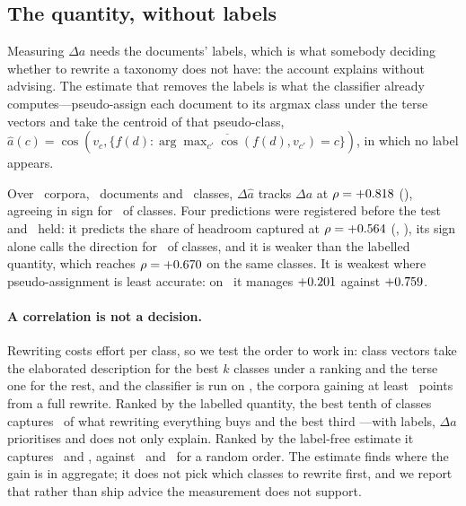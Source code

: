 \documentclass[11pt]{article}
\begin{document}
\subsection{The quantity, without labels}
\label{sec:estimate}

Measuring $\Delta a$ needs the documents' labels, which is what somebody
deciding whether to rewrite a taxonomy does not have: the account explains
without advising. The estimate that removes the labels is what the classifier
already computes---pseudo-assign each document to its argmax class under the
terse vectors and take the centroid of that pseudo-class,
$\hat{a}(c) = \cos(v_c, \overline{\{f(d) : \arg\max_{c'} \cos(f(d), v_{c'}) = c\}})$,
in which no label appears.

Over \EstimateCorpora\ corpora, \EstimateDocuments\ documents and
\EstimateClasses\ classes, $\Delta\hat{a}$ tracks $\Delta a$ at $\rho =
+0.818$ (\EstimateVsTruthPStat), agreeing in sign for
\EstimateSignAgreement\ of classes. Four predictions were registered before
the test and \EstimateHeld\ held: it predicts the share of headroom captured
at $\rho = +0.564$ (\EstimateRhoPStat, \HolmEstimateRhoStat), its sign
alone calls the direction for \EstimateSignRule\ of classes, and it is weaker
than the labelled quantity, which reaches $\rho = +0.670$ on the same
classes. It is weakest where pseudo-assignment is least accurate: on
\EstimateWeakest\ it manages $+0.201$ against
$+0.759$.

\paragraph{A correlation is not a decision.}
Rewriting costs effort per class, so we test the order to work in: class
vectors take the elaborated description for the best $k$ classes under a
ranking and the terse one for the rest, and the classifier is run on
\PriorityCorpora, the corpora gaining at least \PriorityMinGain~points from a
full rewrite. Ranked by the labelled quantity, the best tenth of classes
captures \LabelledTenth\ of what rewriting everything buys and the best third
\LabelledThird---with labels, $\Delta a$ prioritises and does not only explain.
Ranked by the label-free estimate it captures \EstimateTenth\ and
\EstimateThird, against \RandomTenth\ and \RandomThird\ for a random order.
The estimate finds where the gain is in aggregate; it does not pick which
classes to rewrite first, and we report that rather than ship advice the
measurement does not support.
\end{document}
